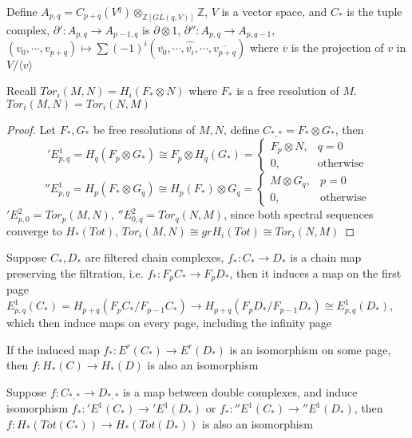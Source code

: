 \documentclass[../main.tex]{subfiles}
\begin{document}
\begin{example}
Define $A_{p,q}=C_{p+q}(V^q)\otimes_{\mathbb Z[GL(q,V)]}\mathbb Z$, $V$ is a vector space, and $C_*$ is the tuple complex, $\partial':A_{p,q}\to A_{p-1,q}$ is $\partial\otimes 1$, $\partial'':A_{p,q}\to A_{p,q-1}$, $(v_0,\cdots,v_{p+q})\mapsto\sum(-1)^i(\overline{v_0},\cdots,\widehat{\overline{v_i}},\cdots,\overline{v_{p+q}})$ where $\overline v$ is the projection of $v$ in $V/\langle v\rangle$
\end{example}

\begin{theorem}
Recall $Tor_i(M,N)=H_i(F_*\otimes N)$ where $F_*$ is a free resolution of $M$. $Tor_i(M,N)=Tor_i(N,M)$
\end{theorem}

\begin{proof}
Let $F_*,G_*$ be free resolutions of $M,N$, define $C_{*,*}=F_*\otimes G_*$, then
\['E^1_{p,q}=H_q(F_p\otimes G_*)\cong F_p\otimes H_q(G_*)=\begin{cases}
F_p\otimes N,&q=0\\
0,&\text{otherwise}
\end{cases}\]
\[''E^1_{p,q}=H_p(F_*\otimes G_q)\cong H_p(F_*)\otimes G_q=\begin{cases}
M\otimes G_q,&p=0\\
0,&\text{otherwise}
\end{cases}\]
$'E^2_{p,0}=Tor_p(M,N)$, $''E^2_{0,q}=Tor_q(N,M)$, since both spectral sequences converge to $H_*(Tot)$, $Tor_i(M,N)\cong grH_i(Tot)\cong Tor_i(N,M)$
\end{proof}

\begin{theorem}\label{Comparison theorem}
Suppose $C_*,D_*$ are filtered chain complexes, $f_*:C_*\to D_*$ is a chain map preserving the filtration, i.e. $f_*:F_pC_*\to F_pD_*$, then it induces a map on the first page $E^1_{p,q}(C_*)=H_{p+q}(F_pC_*/F_{p-1}C_*)\to H_{p+q}(F_pD_*/F_{p-1}D_*)\cong E^1_{p,q}(D_*)$, which then induce maps on every page, including the infinity page \par
If the induced map $f_*:E^r(C_*)\to E^r(D_*)$ is an isomorphism on some page, then $f:H_*(C)\to H_*(D)$ is also an isomorphism
\end{theorem}

\begin{corollary}
Suppose $f:C_{*,*}\to D_{*,*}$ is a map between double complexes, and induce isomorphism $f_*:'E^1(C_*)\to 'E^1(D_*)$ or $f_*:''E^1(C_*)\to ''E^1(D_*)$, then $f:H_*(Tot(C_*))\to H_*(Tot(D_*))$ is also an isomorphism
\end{corollary}
\end{document}
